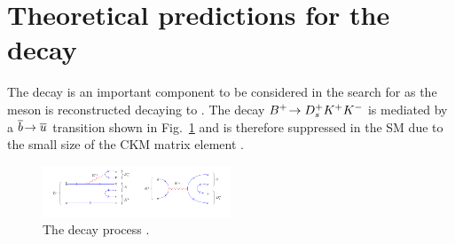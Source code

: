 \section{Theoretical predictions for the \decay{\Bp}{\Dsp\Kp\Km} decay}

The decay \decay{\Bp}{\Dsp\Kp\Km} is an important component to be considered in the search for \decay{\Bp}{\Dsp\phiz} as the \phiz meson is reconstructed decaying to \Kp\Km.
The decay ${{{B}^+}}\!\rightarrow {\ensuremath{{D}^+_{s}}}{\ensuremath{{K}^+}}{\ensuremath{{K}^-}}$ is mediated by a ${\overline {{b}}}\!\rightarrow {\ensuremath{\overline {{u}}}}$ transition shown in Fig.~\ref{fig:Theory_DsKKDiagram} and is therefore suppressed in the SM due to the small size of the CKM matrix element \Vub.
\begin{figure}[!h]
    \centering
    \includegraphics[width=0.5\textwidth]{figs/Theory/B2DsKK.pdf}
    \caption{The decay process \decay{\Bp}{\Dsp\Kp\Km}.}
    \label{fig:Theory_DsKKDiagram}   
\end{figure}

